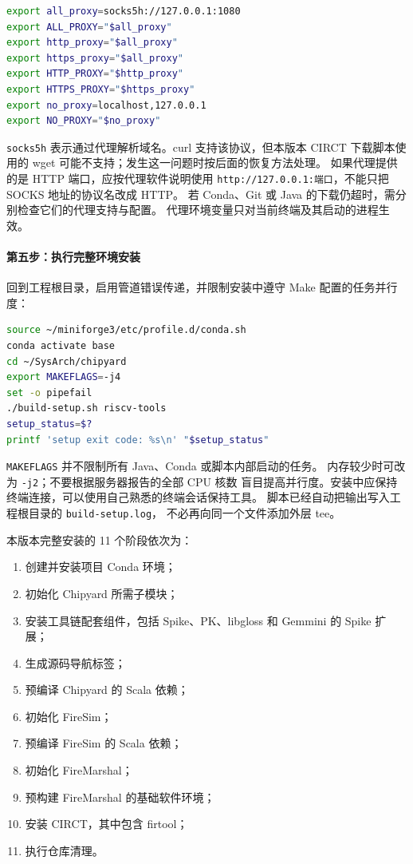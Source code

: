 \begin{lstlisting}[language=bash]
export all_proxy=socks5h://127.0.0.1:1080
export ALL_PROXY="$all_proxy"
export http_proxy="$all_proxy"
export https_proxy="$all_proxy"
export HTTP_PROXY="$http_proxy"
export HTTPS_PROXY="$https_proxy"
export no_proxy=localhost,127.0.0.1
export NO_PROXY="$no_proxy"
\end{lstlisting}

\lstinline|socks5h| 表示通过代理解析域名。curl 支持该协议，但本版本
CIRCT 下载脚本使用的 wget 可能不支持；发生这一问题时按后面的恢复方法处理。
如果代理提供的是 HTTP 端口，应按代理软件说明使用
\lstinline|http://127.0.0.1:端口|，不能只把 SOCKS 地址的协议名改成 HTTP。
若 Conda、Git 或 Java 的下载仍超时，需分别检查它们的代理支持与配置。
代理环境变量只对当前终端及其启动的进程生效。

\paragraph{第五步：执行完整环境安装}
回到工程根目录，启用管道错误传递，并限制安装中遵守 Make 配置的任务并行度：

\begin{lstlisting}[language=bash]
source ~/miniforge3/etc/profile.d/conda.sh
conda activate base
cd ~/SysArch/chipyard
export MAKEFLAGS=-j4
set -o pipefail
./build-setup.sh riscv-tools
setup_status=$?
printf 'setup exit code: %s\n' "$setup_status"
\end{lstlisting}

\lstinline|MAKEFLAGS| 并不限制所有 Java、Conda 或脚本内部启动的任务。
内存较少时可改为 \lstinline|-j2|；不要根据服务器报告的全部 CPU 核数
盲目提高并行度。安装中应保持终端连接，可以使用自己熟悉的终端会话保持工具。
脚本已经自动把输出写入工程根目录的 \lstinline|build-setup.log|，
不必再向同一个文件添加外层 tee。

本版本完整安装的 11 个阶段依次为：
\begin{enumerate}
  \item 创建并安装项目 Conda 环境；
  \item 初始化 Chipyard 所需子模块；
  \item 安装工具链配套组件，包括 Spike、PK、libgloss 和 Gemmini 的 Spike 扩展；
  \item 生成源码导航标签；
  \item 预编译 Chipyard 的 Scala 依赖；
  \item 初始化 FireSim；
  \item 预编译 FireSim 的 Scala 依赖；
  \item 初始化 FireMarshal；
  \item 预构建 FireMarshal 的基础软件环境；
  \item 安装 CIRCT，其中包含 firtool；
  \item 执行仓库清理。
\end{enumerate}

